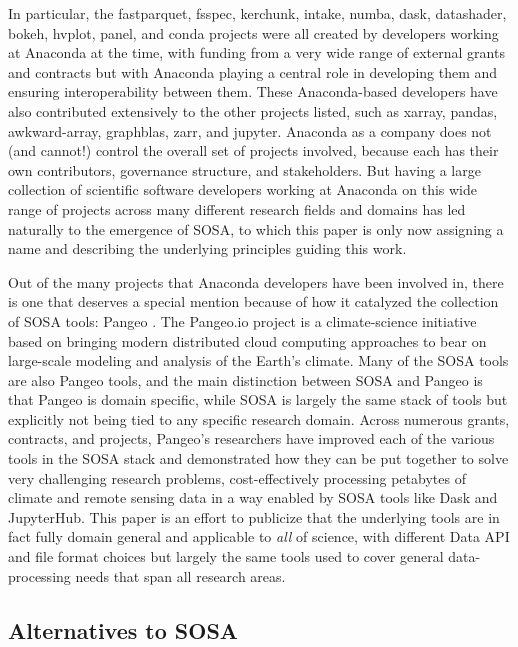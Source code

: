 In particular, the fastparquet, fsspec, kerchunk, intake, numba, dask, datashader, bokeh, hvplot, panel, and conda projects were all created by developers working at Anaconda at the time, with funding from a very wide range of external grants and contracts but with Anaconda playing a central role in developing them and ensuring interoperability between them. These Anaconda-based developers have also contributed extensively to the other projects listed, such as xarray, pandas, awkward-array, graphblas, zarr, and jupyter. Anaconda as a company does not (and cannot!) control the overall set of projects involved, because each has their own contributors, governance structure, and stakeholders. But having a large collection of scientific software developers working at Anaconda on this wide range of projects across many different research fields and domains has led naturally to the emergence of SOSA, to which this paper is only now assigning a name and describing the underlying principles guiding this work.

Out of the many projects that Anaconda developers have been involved in, there is one that deserves a special mention because of how it catalyzed the collection of SOSA tools: Pangeo \cite{odaka:tthpc20}. The Pangeo.io project is a climate-science initiative based on bringing modern distributed cloud computing approaches to bear on large-scale modeling and analysis of the Earth's climate. Many of the SOSA tools are also Pangeo tools, and the main distinction between SOSA and Pangeo is that Pangeo is domain specific, while SOSA is largely the same stack of tools but explicitly not being tied to any specific research domain. Across numerous grants, contracts, and projects, Pangeo's researchers have improved each of the various tools in the SOSA stack and demonstrated how they can be put together to solve very challenging research problems, cost-effectively processing petabytes of climate and remote sensing data in a way enabled by SOSA tools like Dask and JupyterHub. This paper is an effort to publicize that the underlying tools are in fact fully domain general and applicable to \emph{all} of science, with different Data API and file format choices but largely the same tools used to cover general data-processing needs that span all research areas. 

\subsection{Alternatives to SOSA}

